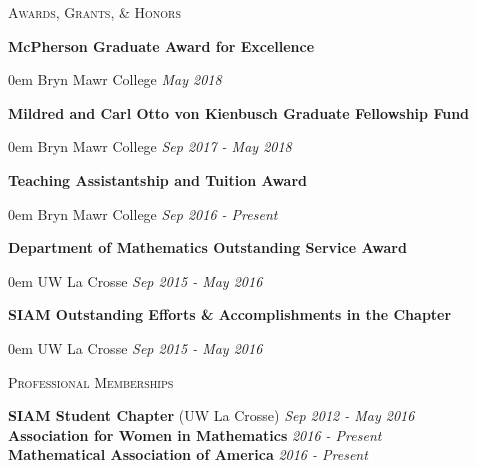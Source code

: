 \documentclass[11pt]{article}
\newenvironment{headitem}[2]{\hspace{.5em} \textbf{#1} \hfill #2 \begin{addmargin}[0em]{0em}}{\end{addmargin}}
\renewenvironment{section}[1]{\textsc{\large #1} \vskip5pt}{\vskip10pt}
\newcommand{\itemdate}[2]{\hspace{.5em} #1 \hfill \textit{#2} \\}
\begin{document}
\begin{section}{Awards, Grants, \& Honors}
	
	\begin{headitem}{McPherson Graduate Award for Excellence}{}
		\itemdate{Bryn Mawr College}{May 2018}
	\end{headitem}
	\vskip5pt
	
	\begin{headitem}{Mildred and Carl Otto von Kienbusch Graduate Fellowship Fund}{}
		\itemdate{Bryn Mawr College}{Sep 2017 - May 2018}
	\end{headitem}
	\vskip5pt
	
	\begin{headitem}{Teaching Assistantship and Tuition Award}{}
		\itemdate{Bryn Mawr College}{Sep 2016 - Present}
	\end{headitem}
	\vskip5pt
	
	\begin{headitem}{Department of Mathematics Outstanding Service Award}{}
		\itemdate{UW La Crosse}{Sep 2015 - May 2016}
	\end{headitem}
	\vskip5pt
	
	\begin{headitem}{SIAM Outstanding Efforts \& Accomplishments in the Chapter}{}
		\itemdate{UW La Crosse}{Sep 2015 - May 2016}
	\end{headitem}
	
\end{section}



\begin{section}{Professional Memberships}
	
	\itemdate{\textbf{SIAM Student Chapter} (UW La Crosse)}{Sep 2012 - May 2016}
	\itemdate{\textbf{Association for Women in Mathematics}}{2016 - Present}
	\itemdate{\textbf{Mathematical Association of America}}{2016 - Present}
	
\end{section}

		
\end{document}

